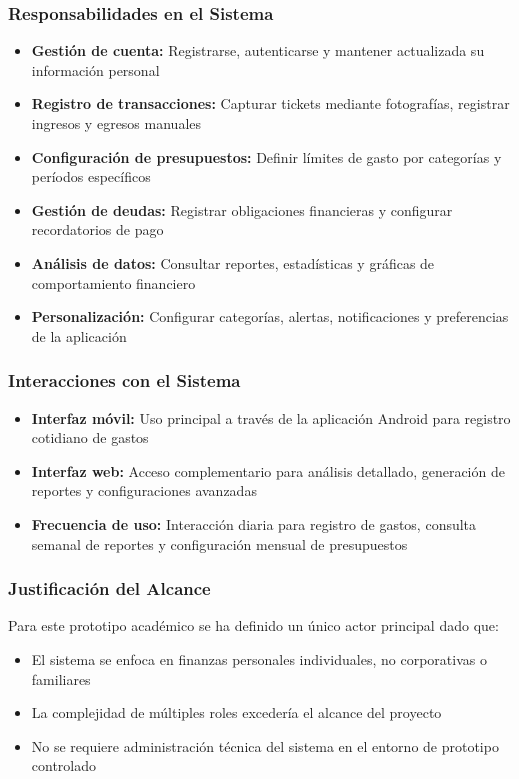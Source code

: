 \subsubsection{Responsabilidades en el Sistema}
\begin{itemize}
    \item \textbf{Gestión de cuenta:} Registrarse, autenticarse y mantener actualizada su información personal
    \item \textbf{Registro de transacciones:} Capturar tickets mediante fotografías, registrar ingresos y egresos manuales
    \item \textbf{Configuración de presupuestos:} Definir límites de gasto por categorías y períodos específicos
    \item \textbf{Gestión de deudas:} Registrar obligaciones financieras y configurar recordatorios de pago
    \item \textbf{Análisis de datos:} Consultar reportes, estadísticas y gráficas de comportamiento financiero
    \item \textbf{Personalización:} Configurar categorías, alertas, notificaciones y preferencias de la aplicación
\end{itemize}

\subsubsection{Interacciones con el Sistema}
\begin{itemize}
    \item \textbf{Interfaz móvil:} Uso principal a través de la aplicación Android para registro cotidiano de gastos
    \item \textbf{Interfaz web:} Acceso complementario para análisis detallado, generación de reportes y configuraciones avanzadas
    \item \textbf{Frecuencia de uso:} Interacción diaria para registro de gastos, consulta semanal de reportes y configuración mensual de presupuestos
\end{itemize}

\subsubsection{Justificación del Alcance}
Para este prototipo académico se ha definido un único actor principal dado que:
\begin{itemize}
    \item El sistema se enfoca en finanzas personales individuales, no corporativas o familiares
    \item La complejidad de múltiples roles excedería el alcance del proyecto
    \item No se requiere administración técnica del sistema en el entorno de prototipo controlado
\end{itemize}

